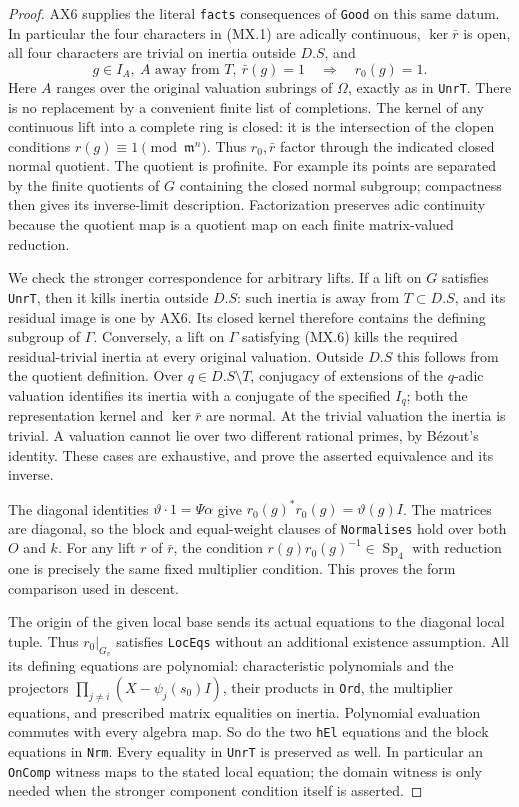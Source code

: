 \begin{proof}
AX6 supplies the literal \texttt{facts} consequences of
\texttt{Good} on this same datum.  In particular the four
characters in (MX.1) are adically continuous, $\ker\bar r$
is open, all four characters are trivial on inertia outside
$D.S$, and
\[
 g\in I_A,\ A\text{ away from }T,\ \bar r(g)=1
           \quad\Longrightarrow\quad r_0(g)=1.
 \tag{MX.7}
\]
Here $A$ ranges over the original valuation subrings of
$\Omega$, exactly as in \texttt{UnrT}.  There is no replacement
by a convenient finite list of completions.
The kernel of any continuous lift into a complete ring is
closed: it is the intersection of the clopen conditions
$r(g)\equiv1\pmod {\mathfrak m^n}$.  Thus $r_0,\bar r$
factor through the indicated closed normal quotient.
The quotient is profinite.  For example its points are separated
by the finite quotients of $G$ containing the closed normal
subgroup; compactness then gives its inverse-limit description.
Factorization preserves adic continuity because the quotient
map is a quotient map on each finite matrix-valued reduction.

We check the stronger correspondence for arbitrary lifts.
If a lift on $G$ satisfies \texttt{UnrT}, then it kills inertia
outside $D.S$: such inertia is away from $T\subset D.S$,
and its residual image is one by AX6.  Its closed kernel
therefore contains the defining subgroup of $\Gamma$.
Conversely, a lift on $\Gamma$ satisfying (MX.6) kills the
required residual-trivial inertia at every original valuation.
Outside $D.S$ this follows from the quotient definition.
Over $q\in D.S\setminus T$, conjugacy of extensions of the
$q$-adic valuation identifies its inertia with a conjugate of
the specified $I_q$; both the representation kernel and
$\ker\bar r$ are normal.  At the trivial valuation the inertia
is trivial.  A valuation cannot lie over two different rational
primes, by B\'ezout's identity.  These cases are exhaustive,
and prove the asserted equivalence and its inverse.

The diagonal identities
$\vartheta\cdot1=\Psi\alpha$ give
$r_0(g)^*r_0(g)=\vartheta(g)I$.
The matrices are diagonal, so the block and equal-weight clauses
of \texttt{Normalises} hold over both $O$ and $k$.
For any lift $r$ of $\bar r$, the condition
$r(g)r_0(g)^{-1}\in\operatorname{Sp}_4$ with reduction one
is precisely the same fixed multiplier condition.  This proves
the form comparison used in descent.

The origin of the given local base sends its actual equations
to the diagonal local tuple.  Thus $r_0|_{G_v}$ satisfies
\texttt{LocEqs} without an additional existence assumption.
All its defining equations are polynomial: characteristic
polynomials and the projectors
$\prod_{j\ne i}(X-\psi_j(s_0)I)$, their products in
\texttt{Ord}, the multiplier equations, and prescribed
matrix equalities on inertia.  Polynomial evaluation commutes
with every algebra map.  So do the two \texttt{hEl}
equations and the block equations in \texttt{Nrm}.
Every equality in \texttt{UnrT} is preserved as well.
In particular an \texttt{OnComp} witness maps to the stated
local equation; the domain witness is only needed when the
stronger component condition itself is asserted.
\end{proof}

